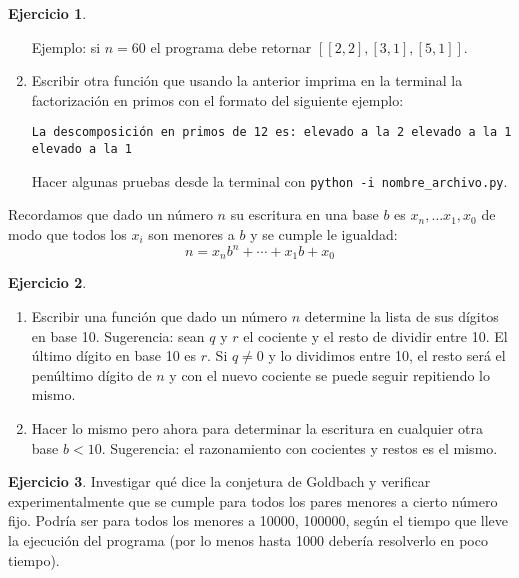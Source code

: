 \documentclass[a4paper,12pt]{book}
\theoremstyle{definition}
\newtheorem{ejercicio}{Ejercicio}
\begin{document}
\begin{ejercicio}
\begin{enumerate}
			Ejemplo: si $n=60$ el programa debe retornar $[[2,2],[3,1],[5,1]]$.
			
			\item Escribir otra función que usando la anterior imprima en la terminal la factorización en primos con el formato del siguiente ejemplo:
	
				{\tt La descomposición en primos de 12 es:
				 elevado a la 2
				 elevado a la 1
				 elevado a la 1}
				
				
			Hacer algunas pruebas desde la terminal con {\tt python -i nombre\_archivo.py}.
		\end{enumerate}
	\end{ejercicio}
	
	Recordamos que dado un número $n$ su escritura en una base $b$ es $x_n,\dots x_1,x_0$ de modo que todos los $x_i$ son menores a $b$ y se cumple le igualdad:
	$$n = x_nb^n+\cdots+x_1b+x_0
	$$
	
	\begin{ejercicio}
		\begin{enumerate}
			\item Escribir una función que dado un número $n$ determine la lista de sus dígitos en base 10. Sugerencia: sean $q$ y $r$ el cociente y el resto de dividir entre 10. El último dígito en base 10 es $r$. Si $q\not=0$ y lo dividimos entre 10, el resto será el penúltimo dígito de $n$ y con el nuevo cociente se puede seguir repitiendo lo mismo.
			
			\item Hacer lo mismo pero ahora para determinar la escritura en cualquier otra base $b<10$. Sugerencia: el razonamiento con cocientes y  restos es el mismo.
		\end{enumerate}
	\end{ejercicio}
	
	\begin{ejercicio}
		Investigar qué dice la conjetura de Goldbach y verificar experimentalmente que se cumple para todos los pares menores a cierto número fijo. Podría ser para todos los menores a 10000, 100000, según el tiempo que lleve la ejecución del programa (por lo menos hasta 1000 debería resolverlo en poco tiempo).
	\end{ejercicio}
	
\end{document}
